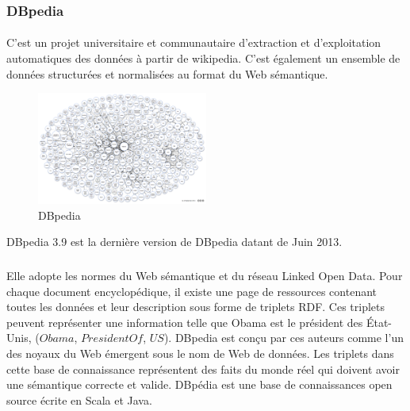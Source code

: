 \subsubsection{DBpedia}
\paragraph{}
C'est un projet universitaire et communautaire d’extraction et d’exploitation automatiques des données à partir de wikipedia. C’est également un ensemble de données structurées et normalisées au format du Web sémantique.
\begin{figure}
\vspace{-10pt}
\begin{center}
\includegraphics[width=0.50\textwidth]{dbpedia.png}
\end{center}
\vspace{-15pt}
\caption{DBpedia}
\vspace{-10pt}
\end{figure}
DBpedia 3.9 est la dernière version de DBpedia datant de Juin 2013.
\subparagraph{}
Elle adopte les normes du Web sémantique et du réseau Linked Open Data. Pour chaque document encyclopédique, il existe une page de ressources contenant toutes les données et leur description sous forme de triplets RDF. Ces triplets peuvent représenter une information telle que Obama est le président des État-Unis, ($Obama$, $PresidentOf$, $US$).
DBpedia est conçu par ces auteurs comme l'un des noyaux du Web émergent sous le nom de Web de données. Les triplets dans cette base de connaissance représentent des faits du monde réel qui doivent avoir une sémantique correcte et valide. DBpédia est une base de connaissances open source écrite en Scala et Java.
\newpage
